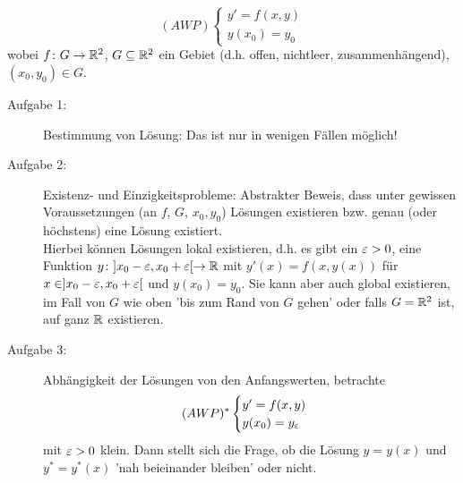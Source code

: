 \begin{bemerkung}
	\[ (AWP)\begin{cases}
	y'=f(x,y)\\y(x_0)=y_0
	\end{cases} \]
	wobei $ f\colon G\rightarrow\mathbb{R}^2 $, $ G\subseteq\mathbb{R}^2 $ ein Gebiet (d.h. offen, nichtleer, zusammenh\"angend), $ (x_0,y_0)\in G $.
	\begin{description}
		\item[Aufgabe 1:] Bestimmung von L\"osung: Das ist nur in wenigen F\"allen m\"oglich!
		\item[Aufgabe 2:] Existenz- und Einzigkeitsprobleme: Abstrakter Beweis, dass unter gewissen Voraussetzungen (an $ f $, $ G $, $ x_0,y_0 $) L\"osungen existieren bzw. genau (oder h\"ochstens) eine L\"osung existiert.\\
		Hierbei k\"onnen L\"osungen lokal existieren, d.h. es gibt ein $ \varepsilon>0 $, eine Funktion $ y\colon ]x_0-\varepsilon,x_0+\varepsilon[\rightarrow\mathbb{R} $ mit $ y'(x)=f(x,y(x)) $ f\"ur $ x\in]x_0-\varepsilon,x_0+\varepsilon[ $ und $ y(x_0)=y_0 $. Sie kann aber auch global existieren, im Fall von $ G $ wie oben 'bis zum Rand von $ G $ gehen' oder falls $ G=\mathbb{R}^2 $ ist, auf ganz $ \mathbb{R} $ existieren.
		\item[Aufgabe 3:] Abh\"angigkeit der L\"osungen von den Anfangswerten, betrachte
		\[ (AWP)^\ast \begin{cases}
		y'=f(x,y)\\y(x_0)=y_\varepsilon
		\end{cases} \]
		mit $ \varepsilon>0 $ klein. Dann stellt sich die Frage, ob die L\"osung $ y=y(x) $ und $ y^\ast=y^\ast(x) $ 'nah beieinander bleiben' oder nicht. 
	\end{description}
\end{bemerkung}
